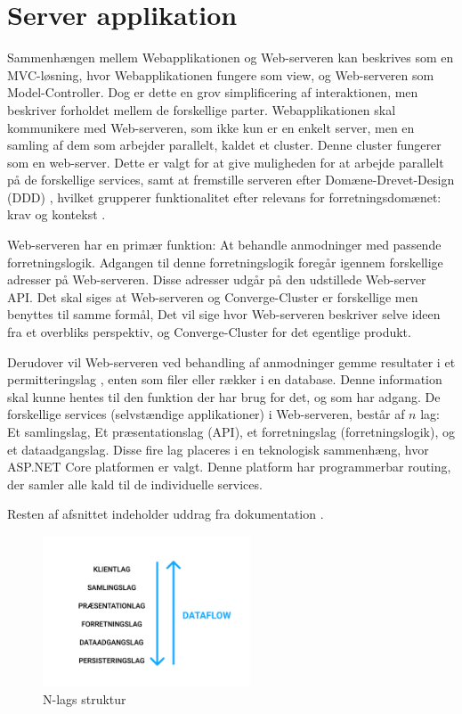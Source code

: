 
\section{Server applikation}

Sammenhængen mellem Webapplikationen og Web-serveren kan beskrives som en MVC-løsning, hvor Webapplikationen fungere som view, og Web-serveren som Model-Controller. Dog er dette en grov simplificering af interaktionen, men beskriver forholdet mellem de forskellige parter. Webapplikationen skal kommunikere med Web-serveren, som ikke kun er en enkelt server, men en samling af dem som arbejder parallelt, kaldet et cluster. Denne cluster fungerer som en web-server. Dette er valgt for at give muligheden for at arbejde parallelt på de forskellige services, samt at fremstille serveren efter Domæne-Drevet-Design (DDD) \cite[DDD]{converge-terms}, hvilket grupperer funktionalitet efter relevans for forretningsdomænet: krav og kontekst \cite{documentation-kravspec}.

Web-serveren har en primær funktion: At behandle anmodninger med passende forretningslogik. Adgangen til denne forretningslogik foregår igennem forskellige adresser på Web-serveren. Disse adresser udgår på den udstillede Web-server API. Det skal siges at Web-serveren og Converge-Cluster er forskellige men benyttes til samme formål, Det vil sige hvor Web-serveren beskriver selve ideen fra et overbliks perspektiv, og Converge-Cluster for det egentlige produkt.

Derudover vil Web-serveren ved behandling af anmodninger gemme resultater i et permitteringslag \cite[Permitteringslag]{converge-terms}, enten som filer eller rækker i en database. Denne information skal kunne hentes til den funktion der har brug for det, og som har adgang. De forskellige services (selvstændige applikationer) i Web-serveren,  består af $n$ lag: Et samlingslag, Et præsentationslag (API), et forretningslag (forretningslogik), og et dataadgangslag. Disse fire lag placeres i en teknologisk sammenhæng, hvor ASP.NET Core platformen er valgt. Denne platform har programmerbar routing, der samler alle kald til de individuelle services.

Resten af afsnittet indeholder uddrag fra dokumentation \cite{software-architecture}.

\begin{figure}[H]
  \begin{small}
    \begin{center}
      \includegraphics[width=0.55\textwidth]{Billeder/N-lag.pdf}
    \end{center}
    \caption{N-lags struktur}
    \label{fig:n-layer}
  \end{small}
\end{figure}

